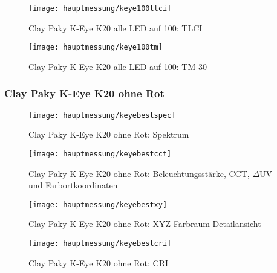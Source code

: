 \documentclass[pagesize,paper=A4,fontsize=12pt,utf8,numbers=noenddot,bibliography=totoc,listof=totoc,DIV=11,BCOR=1mm]{scrreprt}
\begin{document}
\begin{figure}[htp]     %
\centering
\texttt{[image: hauptmessung/keye100tlci]} 
\caption {Clay Paky K-Eye K20 alle LED auf 100: TLCI} 
\end{figure}

\begin{figure}[htp]     %
\centering
\texttt{[image: hauptmessung/keye100tm]} 
\caption {Clay Paky K-Eye K20 alle LED auf 100: TM-30} 
\end{figure}

\subsubsection{Clay Paky K-Eye K20 ohne Rot}

\begin{figure}[htp]     %
\centering
\texttt{[image: hauptmessung/keyebestspec]} 
\caption {Clay Paky K-Eye K20 ohne Rot: Spektrum} 
\end{figure}

\begin{figure}[htp]     %
\centering
\texttt{[image: hauptmessung/keyebestcct]} 
\caption {Clay Paky K-Eye K20 ohne Rot: Beleuchtungsstärke, CCT, $\Delta$UV und Farbortkoordinaten} 
\end{figure}

\begin{figure}[htp]     %
\centering
\texttt{[image: hauptmessung/keyebestxy]} 
\caption {Clay Paky K-Eye K20 ohne Rot: XYZ-Farbraum Detailansicht} 
\end{figure}

\begin{figure}[htp]     %
\centering
\texttt{[image: hauptmessung/keyebestcri]} 
\caption {Clay Paky K-Eye K20 ohne Rot: CRI} 
\end{figure}
\end{document}
